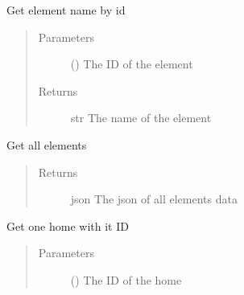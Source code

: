 \documentclass[letterpaper,10pt,english]{sphinxmanual}
\begin{document}
\begin{fulllineitems}
\begin{fulllineitems}
\label{\detokenize{index:Api.Api.get_element_name_by_id}}
\sphinxAtStartPar
Get element name by id
\begin{quote}\begin{description}
\item[{Parameters}] \leavevmode
\sphinxAtStartPar
{} () \textendash{} The ID of the element

\item[{Returns}] \leavevmode
\sphinxAtStartPar
str \textendash{} The name of the element

\end{description}\end{quote}

\end{fulllineitems}


\begin{fulllineitems}
\label{\detokenize{index:Api.Api.get_elements}}
\sphinxAtStartPar
Get all elements
\begin{quote}\begin{description}
\item[{Returns}] \leavevmode
\sphinxAtStartPar
json \textendash{} The json of all elements data

\end{description}\end{quote}

\end{fulllineitems}


\begin{fulllineitems}
\label{\detokenize{index:Api.Api.get_home_by_id}}
\sphinxAtStartPar
Get one home with it ID
\begin{quote}\begin{description}
\item[{Parameters}] \leavevmode
\sphinxAtStartPar
{} () \textendash{} The ID of the home


\end{description}
\end{quote}
\end{fulllineitems}
\end{fulllineitems}
\end{document}
